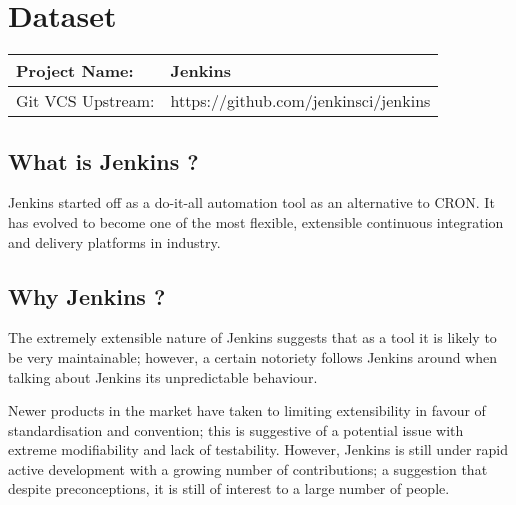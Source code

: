\section{Dataset}


\begin{table}[H]
	\begin{tabular}{ | l |  l |}
		\hline
		Project Name: & Jenkins \\ 
		\hline
		Git VCS Upstream: & https://github.com/jenkinsci/jenkins\\
		\hline
	\end{tabular}
\end{table}


\subsection{What is Jenkins ?}

Jenkins started off as a do-it-all automation tool as an alternative to CRON. It has evolved to become one of the most flexible, extensible continuous integration and delivery platforms in industry.

\subsection{Why Jenkins ?}

The extremely extensible nature of Jenkins suggests that as a tool it is likely to be very maintainable; however, a certain notoriety follows Jenkins around when talking about Jenkins its unpredictable behaviour. 

Newer products in the market have taken to limiting extensibility in favour of standardisation and convention; this is suggestive of a potential issue with extreme modifiability and lack of testability. However, Jenkins is still under rapid active development with a growing number of contributions; a suggestion that despite preconceptions, it is still of interest to a large number of people.